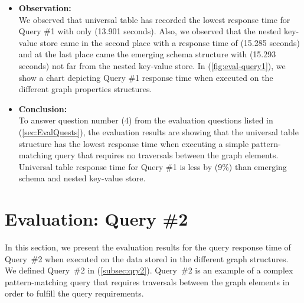 {\begin{itemize}
\item \textbf{Observation:}\\
We observed that universal table has recorded the lowest response time for Query \#1 with only (13.901 seconds). Also, we observed that the nested key-value store came in the second place with a response time of (15.285 seconds) and at the last place came the emerging schema structure with (15.293 seconds) not far from the nested key-value store. In (\ref{fig:eval-query1}), we show a chart depicting Query \#1 response time when executed on the different graph properties structures.

\item \textbf{Conclusion:}\\
To answer question number (4) from the evaluation questions listed in (\ref{sec:EvalQuests}), the evaluation results are showing that the universal table structure has the lowest response time when executing a simple pattern-matching query that requires no traversals between the graph elements. Universal table response time for Query \#1 is less by (9\%) than emerging schema and nested key-value store.

\end{itemize}



\section{Evaluation: Query \#2}
\label{sec:eval-qry2}


In this section, we present the evaluation results for the query response time of \mbox{Query \#2} when executed on the data stored in the different graph structures. We defined \mbox{Query \#2} in (\ref{subsec:qry2}). \mbox{Query \#2} is an example of a complex pattern-matching query that requires traversals between the graph elements in order to fulfill the query requirements.


\begin{itemize}


\end{itemize}}

